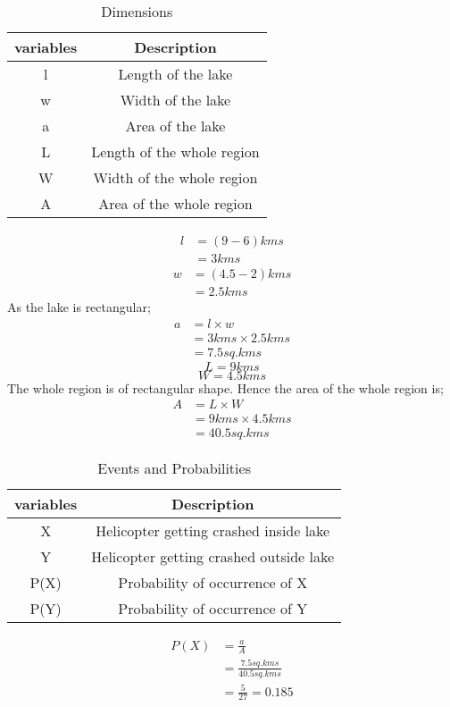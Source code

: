 \begin{table}[h!]
    \label{Table-1}
    \caption{Dimensions}
    \centering
   
    \begin{tabular}{|c|c|}
    \hline
        variables & Description\\
        \hline
        l&Length of the lake\\
        \hline
        w&Width of the lake\\
        \hline
        a&Area of the lake\\
        \hline
        L&Length of the whole region\\
        \hline
        W&Width of the whole region\\
        \hline
        A&Area of the whole region\\
        \hline
    \end{tabular}
\end{table}
\begin{align}
l &= (9-6)kms\\
  &= 3kms 
\end{align}
\begin{align}
w&=(4.5-2)kms\\
 &=2.5kms
\end{align}
As the lake is rectangular;
\begin{align}
a &={l}\times{w}\\
&={3kms}\times{2.5kms}\\
&=7.5sq.kms
\end{align}
$$L=9kms$$
$$W=4.5kms$$
The whole region is of rectangular shape. Hence the area of the whole region is;
\begin{align}
A &={L}\times{W}\\
&={9kms}\times{4.5kms}\\
&=40.5sq.kms
\end{align}
\begin{table}[h!]
    \label{Table-2}
    \caption{Events and Probabilities}
    \centering
    \begin{tabular}{|c|c|}
    \hline
        variables & Description\\
        \hline
        X&Helicopter getting crashed inside lake\\
        \hline
        Y&Helicopter getting crashed outside lake\\
        \hline
        P(X)&Probability of occurrence of X\\
        \hline
        P(Y)&Probability of occurrence of Y\\
        \hline
    \end{tabular}
\end{table}
\begin{align}
    P(X)&=\frac{a}{A}\\
    &=\frac{7.5sq.kms}{40.5sq.kms}\\
    &=\frac{5}{27}=0.185
\end{align}